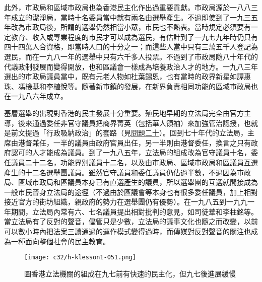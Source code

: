 
此外，市政局和區域市政局也為香港民主化作出過重要貢獻。市政局源於一八八三年成立的潔淨局，當時十名委員當中就有兩名由選舉產生。不過即使到了一九三五年改為市政局後，所謂的選舉仍然相當小眾，市民也不熱衷。當時規定必須要有一定教育、收入或專業程度的市民才可以成為選民，有估計到了一九七九年時仍只有四十四萬人合資格，即當時人口的十分之一；而這些人當中只有三萬五千人登記為選民，而在一九八一年的選舉中只有六千多人投票。不過到了市政局隨八十年代的代議政制發展而變得開放，也和區議會一樣成為培養政治人才的地方。一九八三年選出的市政局議員當中，既有元老人物如杜葉錫恩，也有當時的政界新星如譚惠珠、馮檢基和李植悅等。隨著新市鎮的發展，在新界負責相同功能的區域市政局也在一九八六年成立。

基層選舉的出現對香港的民主發展十分重要。殖民地早期的立法局完全由官方主導，後來通過委任非官守議員把商界菁英（包括華人領袖）來加強管治認授，也就是前文提過「行政吸納政治」的套路（見\hyperref[sec:sec20]{問題二十}）。回到七十年代的立法局，主席由港督兼任，一半的議員由政府官員出任，另一半則由港督委任，換言之只有政府認可的人才能成為議員。到了一九八五年，立法局的組成改為官守議員十名，委任議員二十二名，功能界別議員十二名，以及由市政局、區域市政局和區議員互選產生的十二名選舉團議員。雖然官守議員和委任議員仍佔過半數，不過因為市政局、區域市政局和區議員本身已有直選產生的議員，所以選舉團的互選就間接成為一般市民晉身立法局的途徑（不過由於區議會等本身也有很多委任議員，加上相對接近官方的街坊組織，親政府的勢力在選舉團仍有優勢）。在一九八五到一九九一年期間，立法局內常有六、七名議員提出相對批判的意見，如司徒華和李柱銘等。當立法局有了反對的聲音，儘管只是少數，立法局的議事文化也隨之而改變，以前可以數小時內把法案三讀通過的運作模式變得過時，而傳媒對反對聲音的關注也成為一種面向整個社會的民主教育。

\begin{figure}[htbp]
    \centering
    \texttt{[image: c32/h-klesson1-051.png]}
    \caption{圖香港立法機關的組成在九七前有快速的民主化，但九七後進展緩慢} 
\end{figure}

